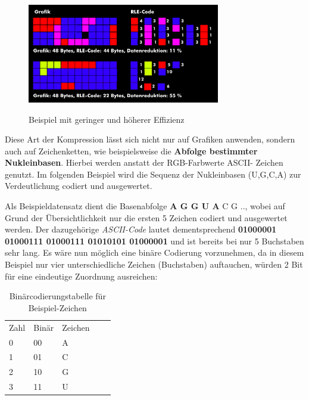 \documentclass[11pt,a4paper,ngerman]{report}
\begin{document}
		\begin{figure} [H]
				\begin{center}
						\includegraphics[width=0.75\textwidth]{g_h_Effizienz.png}
						\caption{Beispiel mit geringer und höherer Effizienz}
						\cite{ITWissen.info}
						\label{Effizienz}
					\end{center}
				\end{figure}
		

		Diese Art der Kompression lässt sich nicht nur auf Grafiken anwenden, sondern auch auf Zeichenketten, wie beispielsweise die \textbf{Abfolge bestimmter Nukleinbasen}. Hierbei werden anstatt der RGB-Farbwerte ASCII- Zeichen genutzt.  Im folgenden Beispiel wird die Sequenz der Nukleinbasen (U,G,C,A) zur Verdeutlichung codiert und ausgewertet.\cite{Juchim2021}

		Als Beispieldatensatz dient die Basenabfolge \textbf{A G G U A} C G  .., wobei auf Grund der Übersichtlichkeit nur die ersten 5 Zeichen codiert und ausgewertet werden. Der dazugehörige \textit{ASCII-Code} lautet dementsprechend \textbf{01000001 01000111 01000111 01010101 01000001 } und ist bereits bei nur 5 Buchstaben sehr lang.
		Es wäre nun möglich eine binäre Codierung vorzunehmen, da in diesem Beispiel nur vier unterschiedliche Zeichen (Buchstaben) auftauchen, würden 2 Bit für eine eindeutige Zuordnung ausreichen: 
			
		\begin{table} [H]
				\begin{center}
				\centering
				\begin{tabular}{lllll}
					Zahl  & Binär & Zeichen &  &  \\
					0 & 00    & A       &  &  \\
					1 & 01    & C       &  &  \\
					2 & 10    & G       &  & \\
					3 & 11	  & U
				\end{tabular}
			\caption{Binärcodierungstabelle für Beispiel-Zeichen}
			\end{center}
			\end{table}
	   
\end{document}

